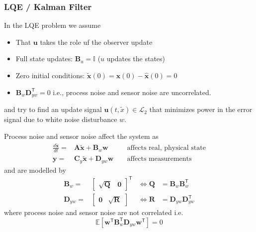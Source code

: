 \subsubsection{LQE / Kalman Filter}


In the LQE problem we assume
\begin{itemize}
    \item That $\mathbf{u}$ takes the role uf the observer update
    \item Full state updates: $\mathbf{B}_u=\mathbf{\mathbb{I}}$ ($u$ updates the states)
    \item Zero initial conditions: $\tilde{\mathbf{x}}(0)=\mathbf{x}(0)-\hat{\mathbf{x}}(0)=0$
    \item $\mathbf{B}_w \mathbf{D}_{yw}^{\mathsf{T}}=0$ i.e., process noise and sensor noise are uncorrelated.
\end{itemize}
and try to find an update signal $\mathbf{u}(t,\tilde{x})\in \mathcal{L}_2$ that minimizes power in the error signal due to white noise disturbance $w$.

\newpar{}

Process noise and sensor noise affect the system as
\begin{align*}
    \frac{d\tilde{\mathbf{x}} }{dt}= & \mathbf{A}\tilde{\mathbf{x}}+\mathbf{B}_{w} \mathbf{w}   &  & \text{ affects real, physical state} \\
    \mathbf{y}=                      & \mathbf{C}_y\tilde{\mathbf{x}}+\mathbf{D}_{yw}\mathbf{w} &  & \text{ affects measurements}
\end{align*}
and are modelled by
\begin{align*}
    \mathbf{B}_w=    & \begin{bmatrix}\sqrt{\mathbf{Q}}&\mathbf{0}\end{bmatrix}^{\mathsf{T}} & \Leftrightarrow \mathbf{Q}          & = \mathbf{B}_w\mathbf{B}_w^{\mathsf{T}}       \\
    \mathbf{D}_{yw}= & \begin{bmatrix}\mathbf{0}&\sqrt{\mathbf{R}}\end{bmatrix}              & \Leftrightarrow \mathbf{\mathbf{R}} & = \mathbf{D}_{yw}\mathbf{D}_{yw}^{\mathsf{T}}
\end{align*}
where process noise and sensor noise are not correlated i.e.
\begin{equation*}
    \mathbb{E}\left[\mathbf{w}^{\mathsf{T}} \mathbf{B}_w^{\mathsf{T}} \mathbf{D}_{yw}\mathbf{w}^{\mathsf{T}}\right]=0
\end{equation*}


